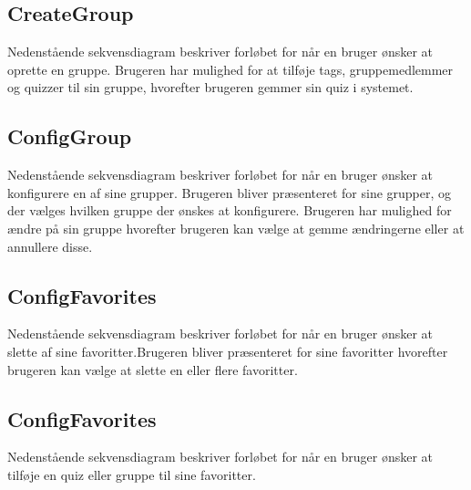 
\subsection*{CreateGroup}
Nedenstående sekvensdiagram beskriver forløbet for når en bruger ønsker at oprette en gruppe. Brugeren har mulighed for at tilføje tags, gruppemedlemmer og quizzer til sin gruppe, hvorefter brugeren gemmer sin quiz i systemet.


\subsection*{ConfigGroup}
Nedenstående sekvensdiagram beskriver forløbet for når en bruger ønsker at konfigurere en af sine grupper. Brugeren bliver præsenteret for sine grupper, og der vælges hvilken gruppe der ønskes at konfigurere. Brugeren har mulighed for ændre på sin gruppe hvorefter brugeren kan vælge at gemme ændringerne eller at annullere disse.


\subsection*{ConfigFavorites}
Nedenstående sekvensdiagram beskriver forløbet for når en bruger ønsker at slette af sine favoritter.Brugeren bliver præsenteret for sine favoritter hvorefter brugeren kan vælge at slette en eller flere favoritter.


\subsection*{ConfigFavorites}
Nedenstående sekvensdiagram beskriver forløbet for når en bruger ønsker at tilføje en quiz eller gruppe til sine favoritter.


